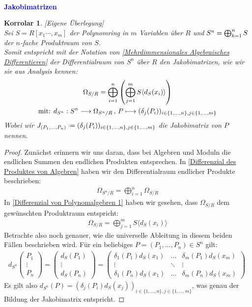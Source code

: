 \documentclass[10pt,a4paper]{report}
\newcounter{Aussage}[chapter]
\newtheorem{korrolar}[Aussage]{Korrolar}
\newcommand{\function}[5]{\nolinebreak{#1:#2 \longrightarrow #3 \, , \, #4 \longmapsto #5}}
\newcommand{\divR}[2]{\Omega_{#1/#2}}
\newcommand{\divf}[1]{d_{#1}}
\newcommand*{\defeq}{\mathrel{\vcenter{\baselineskip0.5ex \lineskiplimit0pt
                     \hbox{\scriptsize.}\hbox{\scriptsize.}}}%
                     =}
\begin{document}
\ \\
\textcolor{blue}{\textbf{Jakobimatrizen}}
\begin{korrolar}\label{Jakobimatrizen}\textit{[Eigene Überlegung]}\\
Sei $S = R[x_1 \cdots , x_m]$ der Polynomring in $m$ Variablen über $R$ und $\nolinebreak{S^n = \bigoplus_{k = 1}^n S}$ der $n$-fache Produktraum von $S$.\\
Somit entspricht mit der Notation von \cref{Mehrdimmensionales Algebraisches Differentieren} der Differentialraum von $S^n$ über $R$ den Jakobimatrizen, wie wir sie aus Analysis kennen:
\begin{gather*}
\divR{S}{R} = \bigoplus_{i = 1}^n \left( \bigoplus_{j = 1}^m S\langle \divf{S}(x_i) \rangle \right)\\
\text{mit: } \function{\divf{S^n}}{S^n}{\divR{S^n}{R}}{P}{(\delta_j(P_i))_{i \in \lbrace 1 , \dots , n \rbrace , j \in \lbrace 1 , \dots , m \rbrace}}
\end{gather*}
Wobei wir $J_{(P_1, \dots ,P_n)} \defeq (\delta_j(P_i))_{i \in \lbrace 1 , \dots , n \rbrace , j \in \lbrace 1 , \dots , m \rbrace}$ die Jakobimatrix von $P$ nennen.
\end{korrolar}
\begin{proof}
Zunächst erinnern wir uns daran, dass bei Algebren und Moduln die endlichen Summen den endlichen Produkten entsprechen.
In \cref{Differenzial des Produktes von Algebren} haben wir den Differentialraum endlicher Produkte beschrieben:
\begin{gather*}
\divR{S^n}{R} = \bigoplus_{i=1}^n \divR{S}{R}
\end{gather*}
In \cref{Differenzial von Polynomalgebren 1} haben wir gesehen, dass $\divR{S}{R}$ dem gewünschten Produktraum entspricht:
\begin{gather*}
\divR{S}{R} = \bigoplus_{j = 1}^m S\langle \divf{S}(x_i) \rangle
\end{gather*}
Betrachte also noch genauer, wie die universelle Ableitung in diesem beiden Fällen beschrieben wird. Für ein beliebiges $P = (P_1, \dots , P_n) \in S^n$ gilt:
\begin{gather*}
\divf{S^n}
\begin{pmatrix}
P_1\\
\vdots\\
P_n
\end{pmatrix}
=
\begin{pmatrix}
\divf{S}(P_1)\\
\vdots\\
\divf{S}(P_n)
\end{pmatrix}
= 
\begin{pmatrix}
\delta_1(P_1) \divf{S}(x_1) & \dots & \delta_m(P_1) \divf{S}(x_m)\\
\vdots & \ddots & \vdots \\
\delta_1(P_n) \divf{S}(x_1) & \dots & \delta_m(P_n) \divf{S}(x_m)
\end{pmatrix}\
\end{gather*}
Es gilt also $\divf{S^n}(P) = (\delta_j(P_i)\divf{S}(x_j))_{i \in \lbrace 1 , \dots , n \rbrace , j \in \lbrace 1 , \dots , m \rbrace}$, was genau der Bildung der Jakobimatrix entspricht.
\end{proof}
\end{document}
